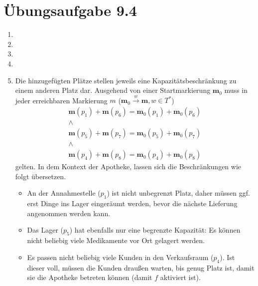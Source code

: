 \documentclass[a4paper]{scrartcl}
\begin{document}
\section*{Übungsaufgabe 9.4} 
\begin{enumerate}
    \item

    \item

    \item

    \item

    \item
        Die hinzugefügten Plätze stellen jeweils eine Kapazitätsbeschränkung zu
        einem anderen Platz dar.
        Ausgehend von einer Startmarkierung $\textbf{m}_0$ muss in jeder
        erreichbaren Markierung $m$
        ($\textbf{m}_0 \stackrel{w}{\to} \textbf{m}, w \in T^*$)
        \begin{equation}
            \begin{gathered}
                \textbf{m}(p_1) + \textbf{m}(p_6) = \textbf{m}_0(p_1) + \textbf{m}_0(p_6) \\
                \land \\
                \textbf{m}(p_5) + \textbf{m}(p_7) = \textbf{m}_0(p_5) + \textbf{m}_0(p_7) \\
                \land \\
                \textbf{m}(p_4) + \textbf{m}(p_8) = \textbf{m}_0(p_4) + \textbf{m}_0(p_8)
            \end{gathered}
        \end{equation}
        gelten.
        In dem Kontext der Apotheke, lassen sich die Beschränkungen wie folgt
        übersetzen.
        \begin{itemize}
            \item
                An der Annahmestelle ($p_1$) ist nicht unbegrenzt Platz, daher
                müssen ggf. erst Dinge ins Lager eingeräumt werden, bevor die
                nächste Lieferung angenommen werden kann.

            \item
                Das Lager ($p_5$) hat ebenfalls nur eine begrenzte Kapazität:
                Es können nicht beliebig viele Medikamente vor Ort gelagert
                werden.

            \item
                Es passen nicht beliebig viele Kunden in den Verkaufsraum
                ($p_4$).
                Ist dieser voll, müssen die Kunden draußen warten, bis genug
                Platz ist, damit sie die Apotheke betreten können (damit $f$
                aktiviert ist).


\end{itemize}
\end{enumerate}
\end{document}
